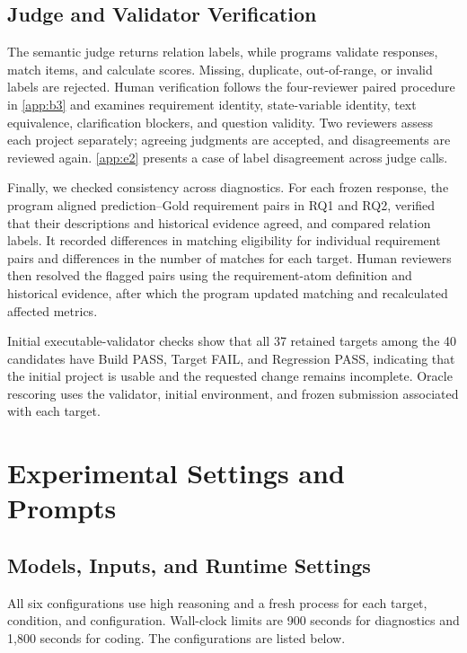 \documentclass{article} %
\begin{document}
\FloatBarrier
\subsection{Judge and Validator Verification}
\label{app:c3}

The semantic judge returns relation labels, while programs validate responses, match items, and calculate scores. Missing, duplicate, out-of-range, or invalid labels are rejected. Human verification follows the four-reviewer paired procedure in \ref{app:b3} and examines requirement identity, state-variable identity, text equivalence, clarification blockers, and question validity. Two reviewers assess each project separately; agreeing judgments are accepted, and disagreements are reviewed again. \ref{app:e2} presents a case of label disagreement across judge calls.

Finally, we checked consistency across diagnostics. For each frozen response, the program aligned prediction--Gold requirement pairs in RQ1 and RQ2, verified that their descriptions and historical evidence agreed, and compared relation labels. It recorded differences in matching eligibility for individual requirement pairs and differences in the number of matches for each target. Human reviewers then resolved the flagged pairs using the requirement-atom definition and historical evidence, after which the program updated matching and recalculated affected metrics.

Initial executable-validator checks show that all 37 retained targets among the 40 candidates have Build PASS, Target FAIL, and Regression PASS, indicating that the initial project is usable and the requested change remains incomplete. Oracle rescoring uses the validator, initial environment, and frozen submission associated with each target.

\FloatBarrier
\section{Experimental Settings and Prompts}
\label{app:d}

\FloatBarrier
\subsection{Models, Inputs, and Runtime Settings}
\label{app:d1}

All six configurations use high reasoning and a fresh process for each target, condition, and configuration. Wall-clock limits are 900 seconds for diagnostics and 1,800 seconds for coding. The configurations are listed below.
\end{document}

